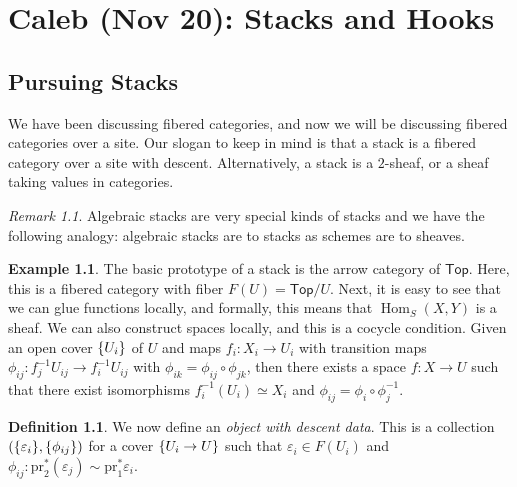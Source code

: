 \documentclass[leqno, openany]{memoir}
\theoremstyle{definition}
\newtheorem{defn}[thm]{Definition}
\newtheorem{exm}[thm]{Example}
\theoremstyle{remark}
\newtheorem{rmk}[thm]{Remark}
\theoremstyle{plain}
\theoremstyle{definition}
\theoremstyle{remark}
\newcommand{\ep}{\varepsilon}
\newcommand{\mr}[1]{\mathrm{#1}}
\newcommand{\ms}[1]{\mathsf{#1}}
\DeclareMathOperator{\Hom}{Hom}
\begin{document}
\chapter{Caleb (Nov 20): Stacks and Hooks}%
\label{cha:caleb_nov_20_stacks_and_hooks}

\section{Pursuing Stacks}%
\label{sec:pursuing_stacks}

We have been discussing fibered categories, and now we will be discussing fibered categories over a site. Our slogan to keep in mind is that a stack is a fibered category over a site with descent. Alternatively, a stack is a $2$-sheaf, or a sheaf taking values in categories.

\begin{rmk}
    Algebraic stacks are very special kinds of stacks and we have the following analogy: algebraic stacks are to stacks as schemes are to sheaves.
\end{rmk}

\begin{exm}
    The basic prototype of a stack is the arrow category of $\ms{Top}$. Here, this is a fibered category with fiber $F(U) = \ms{Top}/U$. Next, it is easy to see that we can glue functions locally, and formally, this means that $\Hom_S(X,Y)$ is a sheaf. We can also construct spaces locally, and this is a cocycle condition. Given an open cover $\qty{U_i}$ of $U$ and maps $f_i \colon X_i \to U_i$ with transition maps $\phi_{ij} \colon f_j^{-1} U_{ij} \to f_i^{-1} U_{ij}$ with $\phi_{ik} = \phi_{ij} \circ \phi_{jk}$, then there exists a space $f \colon X \to U$ such that there exist isomorphisms $f_i^{-1}(U_i) \simeq X_i$ and $\phi_{ij} = \phi_i \circ \phi_j^{-1}$.
\end{exm}

\begin{defn}
    We now define an \textit{object with descent data}. This is a collection $(\qty{\ep_i}, \qty{\phi_{ij}})$ for a cover $\qty{U_i \to U}$ such that $\ep_i \in F(U_i)$ and $\phi_{ij} \colon \mr{pr}_2^*(\ep_j) \sim \mr{pr}_1^* \ep_i$.
\end{defn}
\end{document}
